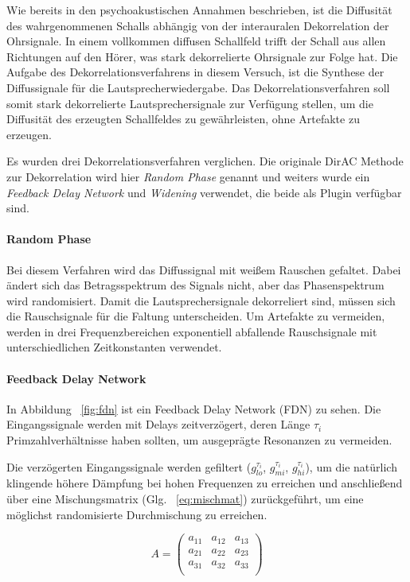 Wie bereits in den psychoakustischen Annahmen beschrieben, ist die Diffusität des wahrgenommenen Schalls abhängig von der interauralen Dekorrelation der Ohrsignale. In einem vollkommen diffusen Schallfeld trifft der Schall aus allen Richtungen auf den Hörer, was stark dekorrelierte Ohrsignale zur Folge hat. Die Aufgabe des Dekorrelationsverfahrens in diesem Versuch, ist die Synthese der Diffussignale für die Lautsprecherwiedergabe. Das Dekorrelationsverfahren soll somit stark dekorrelierte Lautsprechersignale zur Verfügung stellen, um die Diffusität des erzeugten Schallfeldes zu gewährleisten, ohne Artefakte zu erzeugen.

Es wurden drei Dekorrelationsverfahren verglichen. Die originale DirAC Methode zur Dekorrelation wird hier \textit{Random Phase} genannt und weiters wurde ein \textit{Feedback Delay Network} und \textit{Widening} verwendet, die beide als Plugin verfügbar sind.

\paragraph{Random Phase}
\label{randphas}
Bei diesem Verfahren wird das Diffussignal mit weißem Rauschen gefaltet. Dabei ändert sich das Betragsspektrum des Signals nicht, aber das Phasenspektrum wird randomisiert. Damit die Lautsprechersignale dekorreliert sind, müssen sich die Rauschsignale für die Faltung unterscheiden. Um Artefakte zu vermeiden, werden in drei Frequenzbereichen exponentiell abfallende Rauschsignale mit unterschiedlichen Zeitkonstanten verwendet.

\paragraph{Feedback Delay Network}

In Abbildung ~\ref{fig:fdn} ist ein Feedback Delay Network (FDN) zu sehen. Die Eingangssignale werden mit Delays zeitverzögert, deren Länge $\tau_i$ Primzahlverhältnisse haben sollten, um ausgeprägte Resonanzen zu vermeiden.

Die verzögerten Eingangssignale werden gefiltert ($g_{lo}^{\tau_i}$, $g_{mi}^{\tau_i}$, $g_{hi}^{\tau_i}$), um die natürlich klingende höhere Dämpfung bei hohen Frequenzen zu erreichen und anschließend über eine Mischungsmatrix (Glg. ~\ref{eq:mischmat}) zurückgeführt, um eine möglichst randomisierte Durchmischung zu erreichen.

\begin{equation}
    A = 
    \begin{pmatrix}
		a_{11} & a_{12} & a_{13} \\
        a_{21} & a_{22} & a_{23} \\
        a_{31} & a_{32} & a_{33} \\
    \end{pmatrix}
    \label{eq:mischmat}
\end{equation}

